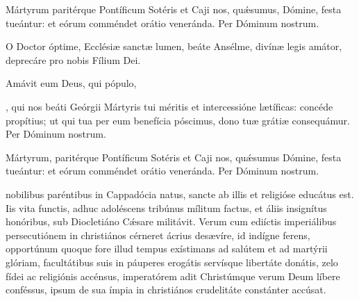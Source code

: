 \documentclass[fontsize=9pt,paper=A6,twoside,BCOR=1mm,DIV=22,headinclude]{scrarticle}
\renewcommand\A\Ant
\begin{document}
\begin{multicols}{2}

\AiMTP 

\VRMTPi 

 Mártyrum paritérque Pontíficum Sotéris et Caji nos, qu\'æsumus, Dómine, festa tueántur: et eórum comméndet orátio veneránda. \red{(}Per Dóminum nostrum.\red{)}


\A O Doctor óptime, Ecclésiæ sanctæ lumen, beáte Ansélme, divínæ legis amátor, deprecáre pro nobis Fílium Dei. \TPA 

\V Amávit eum  Deus, qui pópulo, 




{
\VRMTPi 

\MiMTP

, qui nos beáti Geórgii Mártyris tui méritis et intercessióne lætíficas: concéde propítius; ut qui tua per eum benefícia póscimus, dono tuæ grátiæ consequámur. Per Dóminum nostrum.


\AiiiMTP 

\VRMTPiii 

 Mártyrum, paritérque Pontíficum Sotéris et Caji nos, qu\'æsumus Dómine, festa tueántur: et eórum comméndet orátio veneránda. Per Dóminum nostrum.

 nobilibus paréntibus in Cappadócia natus, sancte ab illis et religióse educátus est. Iis vita functis, adhuc adoléscens tribúnus mílitum factus, et áliis insignítus honóribus, sub Diocletiáno C\'æsare militávit. Verum cum ediíctis imperiálibus persecutiónem in christiános cérneret ácrius desævíre, id indígne ferens, opportúnum quoque fore illud tempus exístimans ad salútem et ad martýrii glóriam, facultátibus suis in páuperes erogátis servísque libertáte donátis, zelo fídei ac religiónis accénsus, imperatórem adit Christúmque verum Deum líbere conféssus, ipsum de sua ímpia in christiános crudelitáte constánter accúsat.

\RVMTPiv

}
\end{multicols}
\end{document}
